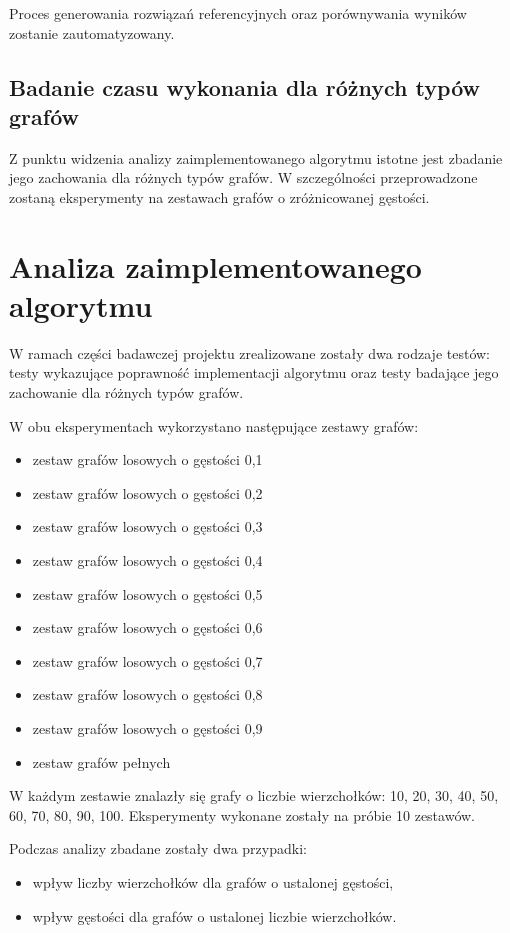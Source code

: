 \documentclass[12pt, a4paper]{article}
\begin{document}
Proces generowania rozwiązań referencyjnych oraz porównywania wyników zostanie zautomatyzowany.
\subsection{Badanie czasu wykonania dla różnych typów grafów}
Z punktu widzenia analizy zaimplementowanego algorytmu istotne jest zbadanie jego zachowania dla różnych typów grafów. W szczególności przeprowadzone zostaną eksperymenty na zestawach grafów o zróżnicowanej gęstości.

\section{Analiza zaimplementowanego algorytmu}
W ramach części badawczej projektu zrealizowane zostały dwa rodzaje testów: testy wykazujące poprawność implementacji algorytmu oraz testy badające jego zachowanie dla różnych typów grafów.

W obu eksperymentach wykorzystano następujące zestawy grafów:
\begin{itemize}
	\item zestaw grafów losowych o gęstości 0,1
	\item zestaw grafów losowych o gęstości 0,2
	\item zestaw grafów losowych o gęstości 0,3
    \item zestaw grafów losowych o gęstości 0,4
	\item zestaw grafów losowych o gęstości 0,5
	\item zestaw grafów losowych o gęstości 0,6
	\item zestaw grafów losowych o gęstości 0,7
	\item zestaw grafów losowych o gęstości 0,8
	\item zestaw grafów losowych o gęstości 0,9
	\item zestaw grafów pełnych
\end{itemize}
W każdym zestawie znalazły się grafy o liczbie wierzchołków: 10, 20, 30, 40, 50, 60, 70, 80, 90, 100. Eksperymenty wykonane zostały na próbie 10 zestawów.

Podczas analizy zbadane zostały dwa przypadki:
\begin{itemize}
	\item wpływ liczby wierzchołków dla grafów o ustalonej gęstości,
	\item wpływ gęstości dla grafów o ustalonej liczbie wierzchołków.
\end{itemize}
\end{document}
